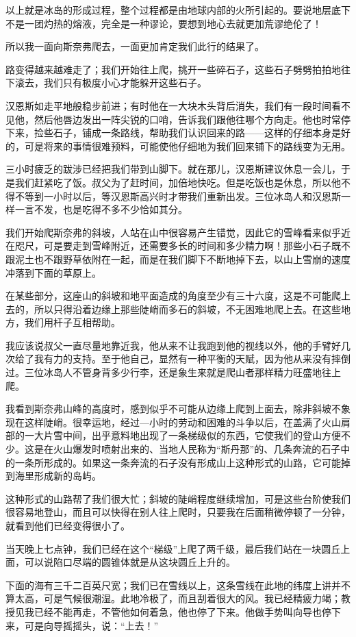 \documentclass[10pt]{book}
\begin{document}
以上就是冰岛的形成过程，整个过程都是由地球内部的火所引起的。要说地层底下不是一团灼热的熔液，完全是一种谬论，要想到地心去就更加荒谬绝伦了！

所以我一面向斯奈弗爬去，一面更加肯定我们此行的结果了。

路变得越来越难走了；我们开始往上爬，挑开一些碎石子，这些石子劈劈拍拍地往下滚去，我们只有极度小心才能躲开这些石子。

汉恩斯如走平地般稳步前进；有时他在一大块木头背后消失，我们有一段时间看不见他，然后他唇边发出一阵尖锐的口哨，告诉我们跟他往哪个方向走。他也时常停下来，捡些石子，铺成一条路线，帮助我们认识回来的路——这样的仔细本身是好的，可是将来的事情很难预料，可能使他仔细地为我们回来铺下的路线变为无用。

三小时疲乏的跋涉已经把我们带到山脚下。就在那儿，汉恩斯建议休息一会儿，于是我们赶紧吃了饭。叔父为了赶时间，加倍地快吃。但是吃饭也是休息，所以他不得不等到一小时以后，等汉恩斯高兴时才带我们重新出发。三位冰岛人和汉恩斯一样一言不发，也是吃得不多不少恰如其分。

我们开始爬斯奈弗的斜坡，人站在山中很容易产生错觉，因此它的雪峰看来似乎近在咫尺，可是要走到雪峰附近，还需要多长的时间和多少精力啊！那些小石子既不跟泥土也不跟野草依附在一起，而是在我们脚下不断地掉下去，以山上雪崩的速度冲落到下面的草原上。

在某些部分，这座山的斜坡和地平面造成的角度至少有三十六度，这是不可能爬上去的，所以只得沿着边缘上那些陡峭而多石的斜坡，不无困难地爬上去。在这些地方，我们用杆子互相帮助。

我应该说叔父一直尽量地靠近我，他从来不让我跑到他的视线以外，他的手臂好几次给了我有力的支持。至于他自己，显然有一种平衡的天赋，因为他从来没有摔倒过。三位冰岛人不管身背多少行李，还是象生来就是爬山者那样精力旺盛地往上爬。

我看到斯奈弗山峰的高度时，感到似乎不可能从边缘上爬到上面去，除非斜坡不象现在这样陡峭。很幸运地，经过—小时的劳动和困难的斗争以后，在盖满了火山肩部的一大片雪中间，出乎意料地出现了一条梯级似的东西，它使我们的登山方便不少。这是在火山爆发时喷射出来的、当地人民称为“斯丹那”的、几条奔流的石子中的一条所形成的。如果这一条奔流的石子没有形成山上这种形式的山路，它可能掉到海里形成新的岛屿。

这种形式的山路帮了我们很大忙；斜坡的陡峭程度继续增加，可是这些台阶使我们很容易地登山，而且可以快得在别人往上爬时，只要我在后面稍微停顿了一分钟，就看到他们已经变得很小了。

当天晚上七点钟，我们已经在这个“梯级”上爬了两千级，最后我们站在一块圆丘上面，可以说陷口尽端的圆锥体就是从这块圆丘上升的。

下面的海有三千二百英尺宽；我们已在雪线以上，这条雪线在此地的纬度上讲并不算太高，可是气候很潮湿。此地冷极了，而且刮着很大的风。我已经精疲力竭；教授见我已经不能再走，不管他如何着急，他也停了下来。他做手势叫向导也停下来，可是向导摇摇头，说：“上去！”
\end{document}
